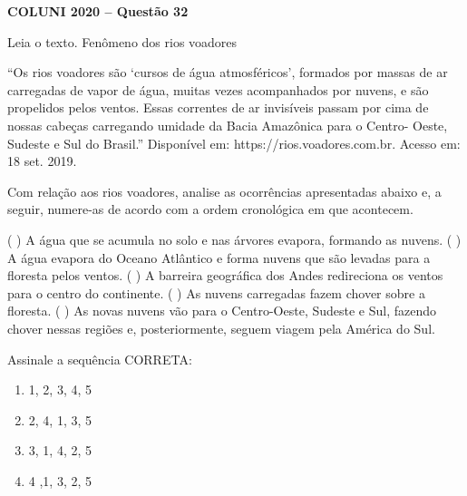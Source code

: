 \textbf{COLUNI 2020 -- Questão 32}\par\medskip Leia o texto. Fenômeno dos rios voadores

\par

“Os rios voadores são ‘cursos de água atmosféricos’, formados por massas de ar carregadas de vapor de água, muitas vezes acompanhados por nuvens, e são propelidos pelos ventos. Essas correntes de ar invisíveis passam por cima de nossas cabeças carregando umidade da Bacia Amazônica para o Centro- Oeste, Sudeste e Sul do Brasil.” Disponível em: https://rios.voadores.com.br. Acesso em: 18 set. 2019.

\par

Com relação aos rios voadores, analise as ocorrências apresentadas abaixo e, a seguir, numere-as de acordo com a ordem cronológica em que acontecem.

\par

(   ) A água que se acumula no solo e nas árvores evapora, formando as nuvens. (   ) A água evapora do Oceano Atlântico e forma nuvens que são levadas para a floresta pelos ventos. (   ) A barreira geográfica dos Andes redireciona os ventos para o centro do continente. (   ) As nuvens carregadas fazem chover sobre a floresta. (   ) As novas nuvens vão para o Centro-Oeste, Sudeste e Sul, fazendo chover nessas regiões e, posteriormente, seguem viagem pela América do Sul.

\par

Assinale a sequência CORRETA:\begin{enumerate}
\item 1, 2, 3, 4, 5
\item 2, 4, 1, 3, 5
\item 3, 1, 4, 2, 5
\item 4 ,1, 3, 2, 5\end{enumerate}
